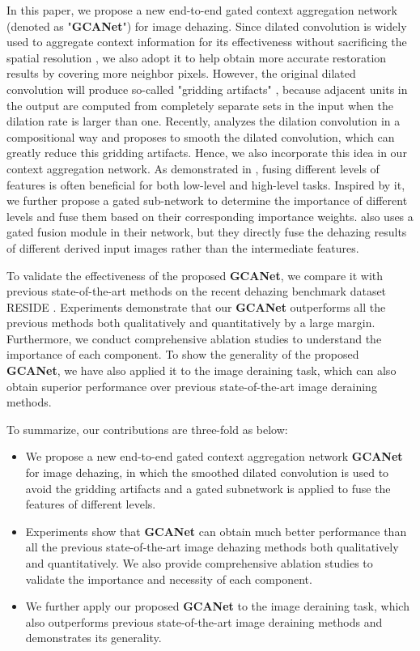 \documentclass[10pt,twocolumn,letterpaper]{article}
\begin{document}
In this paper, we propose a new end-to-end gated context aggregation network (denoted as "\textbf{GCANet}") for image dehazing. Since dilated convolution is widely used to aggregate context information for its effectiveness without sacrificing the spatial resolution \cite{yu2015multi,li2018recurrent,wang2018understanding,hamaguchi2018effective,fan2018decouple}, we also adopt it to help obtain more accurate restoration results by covering more neighbor pixels. However, the original dilated convolution will produce so-called "gridding artifacts" \cite{wang2018understanding,hamaguchi2018effective}, because adjacent units in the output are computed from completely separate sets in the input when the dilation rate is larger than one. Recently, \cite{wang2018smoothed} analyzes the dilation convolution in a compositional way and proposes to smooth the dilated convolution, which can greatly reduce this gridding artifacts. Hence, we also incorporate this idea in our context aggregation network. As demonstrated in \cite{zhang2018densely,Lin_2017_CVPR}, fusing  different levels of features is often beneficial for both low-level and high-level tasks. Inspired by it, we further propose a gated sub-network to determine the importance of different levels and fuse them based on their corresponding importance weights. \cite{ren2018gated} also uses a gated fusion module in their network, but they directly fuse the dehazing results of different derived input images rather than the intermediate features. 

To validate the effectiveness of the proposed \textbf{GCANet}, we compare it with previous state-of-the-art methods on the recent dehazing benchmark dataset RESIDE \cite{li2017reside}. Experiments demonstrate that our \textbf{GCANet} outperforms all the previous methods both qualitatively and quantitatively by a large margin. Furthermore, we conduct comprehensive ablation studies to understand the importance of each component. To show the generality of the proposed \textbf{GCANet}, we have also applied it to the image deraining task, which can also obtain superior performance over previous state-of-the-art image deraining methods.

To summarize, our contributions are three-fold as below:
\begin{itemize}
\item We propose a new end-to-end gated context aggregation network \textbf{GCANet} for image dehazing, in which the smoothed dilated convolution is used to avoid the gridding artifacts and a gated subnetwork is applied to fuse the features of different levels.
\item Experiments show that \textbf{GCANet} can obtain much better performance than all the previous state-of-the-art image dehazing methods both qualitatively and quantitatively. We also provide comprehensive ablation studies to validate the importance and necessity of each component.
\item We further apply our proposed \textbf{GCANet} to the image deraining task, which also outperforms previous state-of-the-art image deraining methods and demonstrates its generality.
\end{itemize}
\end{document}
